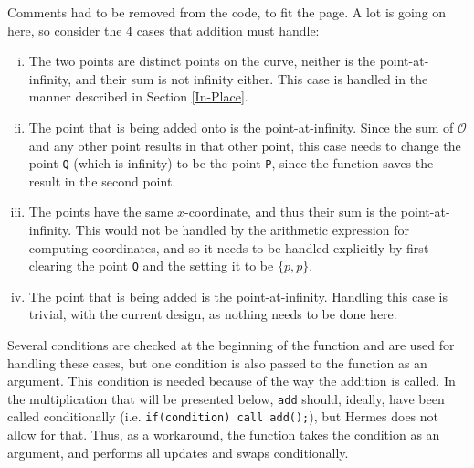 \noindent Comments had to be removed from the code, to fit the page. A lot is going on here, so consider the 4 cases that addition must handle:
\begin{enumerate}[i)]
\item The two points are distinct points on the curve, neither is the point-at-infinity, and their sum is not infinity either. This case is handled in the manner described in Section \ref{In-Place}.
\item The point that is being added onto is the point-at-infinity. Since the sum of $\mathcal{O}$ and any other point results in that other point, this case needs to change the point \texttt{Q} (which is infinity) to be the point \texttt{P}, since the function saves the result in the second point. 
\item The points have the same $x$-coordinate, and thus their sum is the point-at-infinity. This would not be handled by the arithmetic expression for computing coordinates, and so it needs to be handled explicitly by first clearing the point \texttt{Q} and the setting it to be $\{p,p\}$.
\item The point that is being added is the point-at-infinity. Handling this case is trivial, with the current design, as nothing needs to be done here.
\end{enumerate}
Several conditions are checked at the beginning of the function and are used for handling these cases, but one condition is also passed to the function as an argument. This condition is needed because of the way the addition is called. In the multiplication that will be presented below, \texttt{add} should, ideally, have been called conditionally (i.e. \texttt{if(condition) call add();}), but Hermes does not allow for that. Thus, as a workaround, the function takes the condition as an argument, and performs all updates and swaps conditionally.\\

